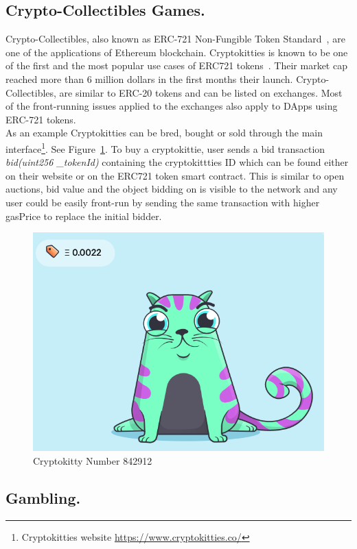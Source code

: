 \subsection{Crypto-Collectibles Games.}

Crypto-Collectibles, also known as ERC-721 Non-Fungible Token Standard~\cite{erc721}, are one of the applications of Ethereum blockchain. Cryptokitties is known to be one of the first and the most popular use cases of ERC721 tokens~\cite{cryptokitties}. Their market cap reached more than 6 million dollars in the first months their launch. Crypto-Collectibles, are similar to ERC-20 tokens and can be listed on exchanges. Most of the front-running issues applied to the exchanges also apply to DApps using ERC-721 tokens. \\

As an example Cryptokitties can be bred, bought or sold through the main interface\footnote{Cryptokitties website \url{https://www.cryptokitties.co/}}. See Figure~\ref{fig:cryptokittie}.
To buy a cryptokittie, user sends a bid transaction \textit{bid(uint256 \_tokenId)} containing the cryptokittties ID which can be found either on their website or on the ERC721 token smart contract. This is similar to open auctions, bid value and the object bidding on is visible to the network and any user could be easily front-run by sending the same transaction with higher gasPrice to replace the initial bidder. 


\begin{figure}[h]
\centering
\includegraphics[width=0.4\linewidth]{figures/cryptokittie842912.png}
\caption{ Cryptokitty Number 842912 \label{fig:cryptokittie}}
\end{figure}



\subsection{Gambling.} 

